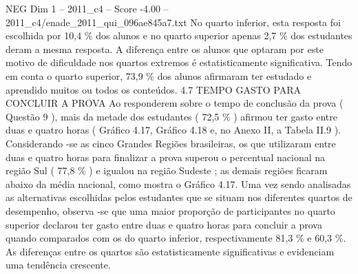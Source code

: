 \begin{textsample}{NEG Dim 1 – 2011\_c4 – Score -4.00 – 2011\_c4/enade\_2011\_qui\_096ae845a7.txt}
No quarto inferior, esta resposta foi escolhida por 10,4 \% dos alunos e no quarto superior apenas 2,7 \% dos estudantes deram a mesma resposta.
A diferença entre os alunos que optaram por este motivo de dificuldade nos quartos extremos é estatisticamente significativa.
Tendo em conta o quarto superior, 73,9 \% dos alunos afirmaram ter estudado e aprendido muitos ou todos os conteúdos. 4.7 TEMPO GASTO PARA CONCLUIR A PROVA Ao responderem sobre o tempo de conclusão da prova ( Questão 9 ), mais da metade dos estudantes ( 72,5 \% ) afirmou ter gasto entre duas e quatro horas ( Gráfico 4.17, Gráfico 4.18 e, no Anexo II, a Tabela II.9 ).
Considerando -se as cinco Grandes Regiões brasileiras, os que utilizaram entre duas e quatro horas para finalizar a prova superou o percentual nacional na região Sul ( 77,8 \% ) e igualou na região Sudeste ; as demais regiões ficaram abaixo da média nacional, como mostra o Gráfico 4.17.
Uma vez sendo analisadas as alternativas escolhidas pelos estudantes que se situam nos diferentes quartos de desempenho, observa -se que uma maior proporção de participantes no quarto superior declarou ter gasto entre duas e quatro horas para concluir a prova quando comparados com os do quarto inferior, respectivamente 81,3 \% e 60,3 \%.
As diferenças entre os quartos são estatisticamente significativas e evidenciam uma tendência crescente.

\end{textsample}
